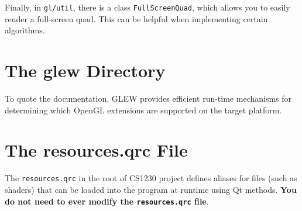 \documentclass[landscape,twocolumn,letterpaper]{article}
\begin{document}
\noindent
Finally, in \texttt{gl/util}, there is a class \texttt{FullScreenQuad}, which allows you to easily render a full-screen quad. This can be helpful when implementing certain algorithms.

\section{The glew Directory}

To quote the documentation,  GLEW provides efficient run-time mechanisms for determining which OpenGL extensions are supported on the target platform.

\section{The resources.qrc File}

The \texttt{resources.qrc} in the root of CS1230 project defines aliases for files (such as shaders) that can be loaded into the program at runtime using Qt methods. \textbf{You do not need to ever modify the \texttt{resources.qrc} file}.
\end{document}
